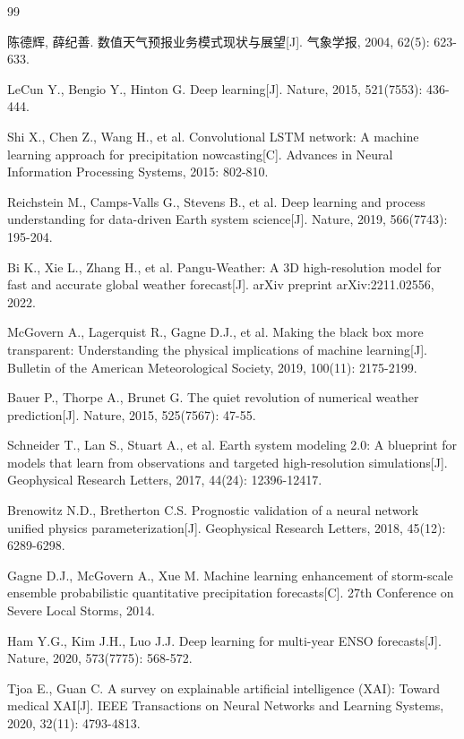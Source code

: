 \documentclass{article}
\begin{document}
\begin{thebibliography}{99}

陈德辉, 薛纪善. 数值天气预报业务模式现状与展望[J]. 气象学报, 2004, 62(5): 623-633.

LeCun Y., Bengio Y., Hinton G. Deep learning[J]. Nature, 2015, 521(7553): 436-444.

Shi X., Chen Z., Wang H., et al. Convolutional LSTM network: A machine learning approach for precipitation nowcasting[C]. Advances in Neural Information Processing Systems, 2015: 802-810.

Reichstein M., Camps-Valls G., Stevens B., et al. Deep learning and process understanding for data-driven Earth system science[J]. Nature, 2019, 566(7743): 195-204.

Bi K., Xie L., Zhang H., et al. Pangu-Weather: A 3D high-resolution model for fast and accurate global weather forecast[J]. arXiv preprint arXiv:2211.02556, 2022.

McGovern A., Lagerquist R., Gagne D.J., et al. Making the black box more transparent: Understanding the physical implications of machine learning[J]. Bulletin of the American Meteorological Society, 2019, 100(11): 2175-2199.

Bauer P., Thorpe A., Brunet G. The quiet revolution of numerical weather prediction[J]. Nature, 2015, 525(7567): 47-55.

Schneider T., Lan S., Stuart A., et al. Earth system modeling 2.0: A blueprint for models that learn from observations and targeted high-resolution simulations[J]. Geophysical Research Letters, 2017, 44(24): 12396-12417.

Brenowitz N.D., Bretherton C.S. Prognostic validation of a neural network unified physics parameterization[J]. Geophysical Research Letters, 2018, 45(12): 6289-6298.

Gagne D.J., McGovern A., Xue M. Machine learning enhancement of storm-scale ensemble probabilistic quantitative precipitation forecasts[C]. 27th Conference on Severe Local Storms, 2014.

Ham Y.G., Kim J.H., Luo J.J. Deep learning for multi-year ENSO forecasts[J]. Nature, 2020, 573(7775): 568-572.

Tjoa E., Guan C. A survey on explainable artificial intelligence (XAI): Toward medical XAI[J]. IEEE Transactions on Neural Networks and Learning Systems, 2020, 32(11): 4793-4813.


\end{thebibliography}
\end{document}
